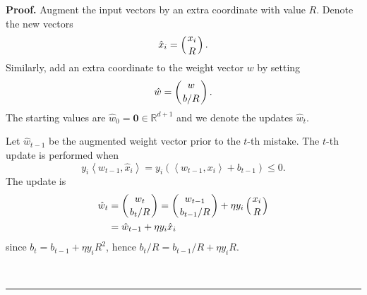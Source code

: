 \documentclass[11pt,twoside]{article}%
\theoremstyle{change}
\newenvironment{proof}[1][Proof]{\textbf{#1.} }{\ \rule{0.5em}{0.5em}}
\begin{document}
\begin{proof}
Augment the input vectors by an extra coordinate with value $R$. Denote the
new vectors
\[
\hat{x}_{i}=\left(
\genfrac{}{}{0pt}{}{x_{i}}{R}%
\right)  .
\]
Similarly, add an extra coordinate to the weight vector $w$ by setting
\[
\hat{w}=\left(
\genfrac{}{}{0pt}{}{w}{b/R}%
\right)  .
\]
The starting values are $\hat{w}_{0}=\mathbf{0\in}\mathbb{R}^{d+1}$ and we
denote the updates $\hat{w}_{t}.$

Let $\hat{w}_{t-1}$ be the augmented weight vector prior to the $t$-th
mistake. The $t$-th update is performed when
\[
y_{i}\left\langle \hat{w}_{t-1},\hat{x}_{i}\right\rangle =y_{i}\left(
\left\langle w_{t-1},x_{i}\right\rangle +b_{t-1}\right)  \leq0.
\]
The update is
\begin{align}
\hat{w}_{t}  & =\left(
\genfrac{}{}{0pt}{}{w_{t}}{b_{t}/R}%
\right)  =\left(
\genfrac{}{}{0pt}{}{w_{t-1}}{b_{t-1}/R}%
\right)  +\eta y_{i}\left(
\genfrac{}{}{0pt}{}{x_{i}}{R}%
\right) \nonumber\\
& =\hat{w}_{t-1}+\eta y_{i}\hat{x}_{i}\label{one-star-handwr}%
\end{align}
since $b_{t}=b_{t-1}+\eta y_{i}R^{2}$, hence $b_{t}/R=b_{t-1}/R+\eta y_{i}R.$


\end{proof}
\end{document}
